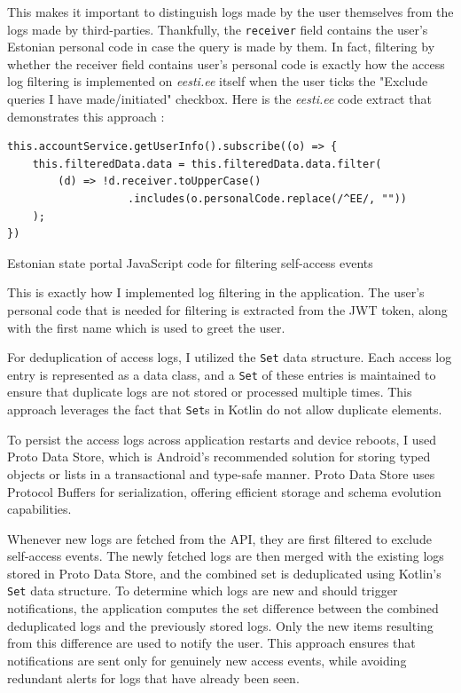 This makes it important to distinguish logs made by the user themselves from the logs made by third-parties. Thankfully, the \texttt{receiver} field contains the user's Estonian personal code in case the query is made by them. In fact, filtering by whether the receiver field contains user's personal code is exactly how the access log filtering is implemented on \textit{eesti.ee} itself when the user ticks the "Exclude queries I have made/initiated" checkbox. Here is the \textit{eesti.ee} code extract that demonstrates this approach \cite{eesti-ee-portal}:

\begin{listing}[H]
\begin{verbatim}
this.accountService.getUserInfo().subscribe((o) => {
    this.filteredData.data = this.filteredData.data.filter(
        (d) => !d.receiver.toUpperCase()
                   .includes(o.personalCode.replace(/^EE/, ""))
    );
})
\end{verbatim}
\caption{Estonian state portal JavaScript code for filtering self-access events}
\label{lst:eesti-ee-filtering}
\end{listing}

This is exactly how I implemented log filtering in the application. The user's personal code that is needed for filtering is extracted from the JWT token, along with the first name which is used to greet the user.

For deduplication of access logs, I utilized the \texttt{Set} data structure. Each access log entry is represented as a data class, and a \texttt{Set} of these entries is maintained to ensure that duplicate logs are not stored or processed multiple times. This approach leverages the fact that \texttt{Set}s in Kotlin do not allow duplicate elements.

To persist the access logs across application restarts and device reboots, I used Proto Data Store, which is Android's recommended solution for storing typed objects or lists in a transactional and type-safe manner. Proto Data Store uses Protocol Buffers \cite{protocol-buffers} for serialization, offering efficient storage and schema evolution capabilities.

Whenever new logs are fetched from the API, they are first filtered to exclude self-access events. The newly fetched logs are then merged with the existing logs stored in Proto Data Store, and the combined set is deduplicated using Kotlin's \texttt{Set} data structure. To determine which logs are new and should trigger notifications, the application computes the set difference between the combined deduplicated logs and the previously stored logs. Only the new items resulting from this difference are used to notify the user. This approach ensures that notifications are sent only for genuinely new access events, while avoiding redundant alerts for logs that have already been seen.

